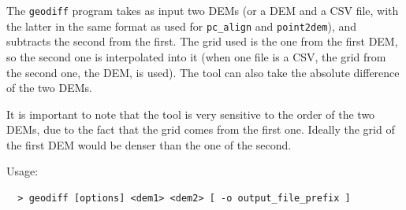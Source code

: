 The \texttt{geodiff} program takes as input two DEMs (or a DEM and a CSV file, with the latter in the same format as used for \texttt{pc\_align} and \texttt{point2dem}), and subtracts the second from the first. The grid used is the one from the first DEM, so the second one is interpolated into it (when one file is a CSV, the grid from the second one, the DEM, is used). The tool can also take the absolute difference of the two DEMs.

It is important to note that the tool is very sensitive to the order of
the two DEMs, due to the fact that the grid comes from the first
one. Ideally the grid of the first DEM would be denser than the one of
the second.

\medskip

Usage:
\begin{verbatim}
  > geodiff [options] <dem1> <dem2> [ -o output_file_prefix ]
\end{verbatim}


